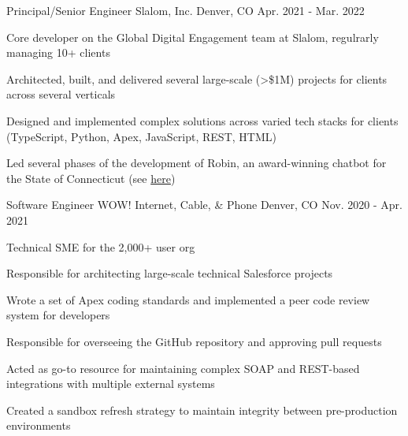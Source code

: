 \begin{cventries}

  \cventry
    {Principal/Senior Engineer} %
    {Slalom, Inc.} %
    {Denver, CO} %
    {Apr. 2021 - Mar. 2022} %
    {
      \begin{cvitems} %
        \item {Core developer on the Global Digital Engagement team at Slalom, regulrarly managing 10+ clients}
        \item {Architected, built, and delivered several large-scale (>\$1M) projects for clients across several verticals}
        \item {Designed and implemented complex solutions across varied tech stacks for clients (TypeScript, Python, Apex, JavaScript, REST, HTML)}
        \item {Led several phases of the development of Robin, an award-winning chatbot for the State of Connecticut (see \href{https://portal.ct.gov/das/dasblog/das-team-wins-government-experience-award}{\color{awesome-skyblue}here})}
      \end{cvitems}
    }

  \cventry
    {Software Engineer} %
    {WOW! Internet, Cable, \& Phone} %
    {Denver, CO} %
    {Nov. 2020 - Apr. 2021} %
    {
      \begin{cvitems} %
        \item {Technical SME for the 2,000+ user org}
        \item {Responsible for architecting large-scale technical Salesforce projects}
        \item {Wrote a set of Apex coding standards and implemented a peer code review system for developers}
        \item {Responsible for overseeing the GitHub repository and approving pull requests}
        \item {Acted as go-to resource for maintaining complex SOAP and REST-based integrations with multiple external systems}
        \item {Created a sandbox refresh strategy to maintain integrity between pre-production environments}
      \end{cvitems}
    }


\end{cventries}

